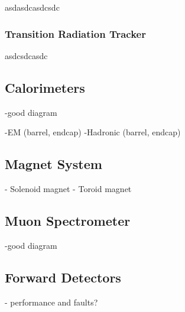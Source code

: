 		asdasdcasdcsdc




		\subsubsection*{Transition Radiation Tracker}



		asdcsdcasdc


	\subsection{Calorimeters}

		-good diagram

		-EM (barrel, endcap)
		-Hadronic (barrel, endcap)


	\subsection{Magnet System}

		- Solenoid magnet 
		- Toroid magnet 


	\subsection{Muon Spectrometer}

		-good diagram


	\subsection{Forward Detectors}


	- performance and faults?



